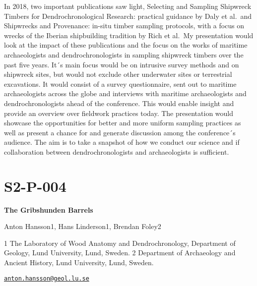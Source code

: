 \documentclass[
]{book}
\begin{document}
In 2018, two important publications saw light, Selecting and Sampling Shipwreck Timbers for Dendrochronological Research: practical guidance by Daly et al.~and Shipwrecks and Provenance: in-situ timber sampling protocols, with a focus on wrecks of the Iberian shipbuilding tradition by Rich et al.~My presentation would look at the impact of these publications and the focus on the works of maritime archaeologists and dendrochronologists in sampling shipwreck timbers over the past five years. It´s main focus would be on intrusive survey methods and on shipwreck sites, but would not exclude other underwater sites or terrestrial excavations. It would consist of a survey questionnaire, sent out to maritime archaeologists across the globe and interviews with maritime archaeologists and dendrochronologists ahead of the conference. This would enable insight and provide an overview over fieldwork practices today. The presentation would showcase the opportunities for better and more uniform sampling practices as well as present a chance for and generate discussion among the conference´s audience. The aim is to take a snapshot of how we conduct our science and if collaboration between dendrochronologists and archaeologists is sufficient.

\hypertarget{s2-p-004}{%
\section*{S2-P-004}\label{s2-p-004}}

\textbf{The Gribshunden Barrels}

Anton Hansson1, Hans Linderson1, Brendan Foley2

1 The Laboratory of Wood Anatomy and Dendrochronology, Department of Geology, Lund University, Lund, Sweden. 2 Department of Archaeology and Ancient History, Lund University, Lund, Sweden.

\href{mailto:anton.hansson@geol.lu.se}{\nolinkurl{anton.hansson@geol.lu.se}}
\end{document}
